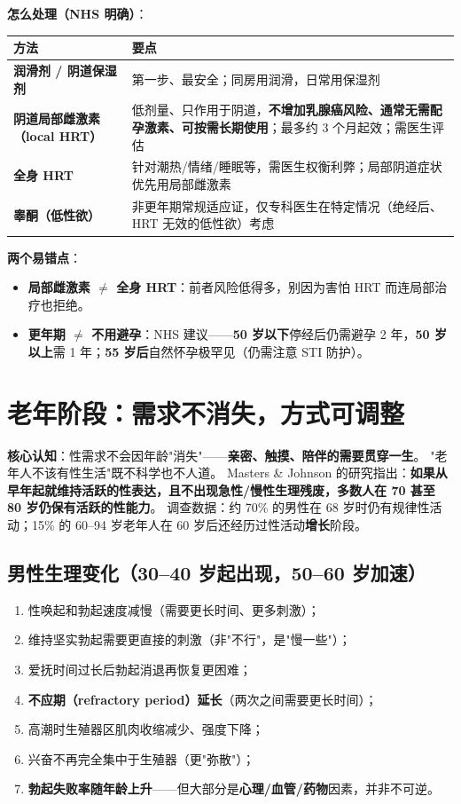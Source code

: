 \documentclass[12pt,UTF8,openany]{ctexbook}
\begin{document}
\textbf{怎么处理（NHS 明确）}：

\begin{tabularx}{\linewidth}{X X}
\toprule
\textbf{方法} & \textbf{要点} \\
\midrule
\textbf{润滑剂 / 阴道保湿剂} & 第一步、最安全；同房用润滑，日常用保湿剂 \\
\textbf{阴道局部雌激素（local HRT）} & 低剂量、只作用于阴道，\textbf{不增加乳腺癌风险、通常无需配孕激素、可按需长期使用}；最多约 3 个月起效；需医生评估 \\
\textbf{全身 HRT} & 针对潮热/情绪/睡眠等，需医生权衡利弊；局部阴道症状优先用局部雌激素 \\
\textbf{睾酮（低性欲）} & 非更年期常规适应证，仅专科医生在特定情况（绝经后、HRT 无效的低性欲）考虑 \\
\bottomrule
\end{tabularx}

\vspace{0.5em}
\textbf{两个易错点}：

\begin{itemize}[leftmargin=2em,itemsep=0.3em]
  \item \textbf{局部雌激素 $\ne$ 全身 HRT}：前者风险低得多，别因为害怕 HRT 而连局部治疗也拒绝。
  \item \textbf{更年期 $\ne$ 不用避孕}：NHS 建议——\textbf{50 岁以下}停经后仍需避孕 2 年，\textbf{50 岁以上}需 1 年；\textbf{55 岁后}自然怀孕极罕见（仍需注意 STI 防护）。
\end{itemize}

\section{老年阶段：需求不消失，方式可调整}

\textbf{核心认知}：性需求不会因年龄"消失"——\textbf{亲密、触摸、陪伴的需要贯穿一生}。
"老年人不该有性生活"既不科学也不人道。
Masters \& Johnson 的研究指出：\textbf{如果从早年起就维持活跃的性表达，且不出现急性/慢性生理残废，多数人在 70 甚至 80 岁仍保有活跃的性能力}。
调查数据：约 70\% 的男性在 68 岁时仍有规律性活动；15\% 的 60--94 岁老年人在 60 岁后还经历过性活动\textbf{增长}阶段。

\subsection*{男性生理变化（30--40 岁起出现，50--60 岁加速）}

\begin{enumerate}[leftmargin=2em,itemsep=0.3em]
  \item 性唤起和勃起速度减慢（需要更长时间、更多刺激）；
  \item 维持坚实勃起需要更直接的刺激（非"不行"，是"慢一些"）；
  \item 爱抚时间过长后勃起消退再恢复更困难；
  \item \textbf{不应期（refractory period）延长}（两次之间需要更长时间）；
  \item 高潮时生殖器区肌肉收缩减少、强度下降；
  \item 兴奋不再完全集中于生殖器（更"弥散"）；
  \item \textbf{勃起失败率随年龄上升}——但大部分是\textbf{心理/血管/药物}因素，并非不可逆。
\end{enumerate}
\end{document}
